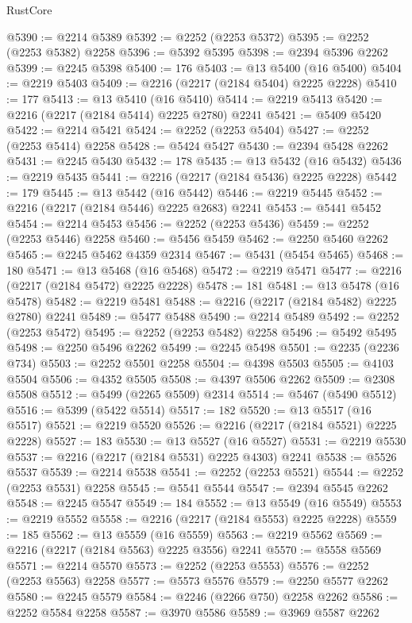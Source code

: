 \begin{lexlean}{RustCore}
\begin{coremodule}
@5390 := @2214 @5389
@5392 := @2252 (@2253 @5372)
@5395 := @2252 (@2253 @5382) @2258
@5396 := @5392 @5395
@5398 := @2394 @5396 @2262
@5399 := @2245 @5398
@5400 := 176
@5403 := @13 @5400 (@16 @5400)
@5404 := @2219 @5403
@5409 := @2216 (@2217 (@2184 @5404) @2225 @2228)
@5410 := 177
@5413 := @13 @5410 (@16 @5410)
@5414 := @2219 @5413
@5420 := @2216 (@2217 (@2184 @5414) @2225 @2780) @2241
@5421 := @5409 @5420
@5422 := @2214 @5421
@5424 := @2252 (@2253 @5404)
@5427 := @2252 (@2253 @5414) @2258
@5428 := @5424 @5427
@5430 := @2394 @5428 @2262
@5431 := @2245 @5430
@5432 := 178
@5435 := @13 @5432 (@16 @5432)
@5436 := @2219 @5435
@5441 := @2216 (@2217 (@2184 @5436) @2225 @2228)
@5442 := 179
@5445 := @13 @5442 (@16 @5442)
@5446 := @2219 @5445
@5452 := @2216 (@2217 (@2184 @5446) @2225 @2683) @2241
@5453 := @5441 @5452
@5454 := @2214 @5453
@5456 := @2252 (@2253 @5436)
@5459 := @2252 (@2253 @5446) @2258
@5460 := @5456 @5459
@5462 := @2250 @5460 @2262
@5465 := @2245 @5462 @4359 @2314
@5467 := @5431 (@5454 @5465)
@5468 := 180
@5471 := @13 @5468 (@16 @5468)
@5472 := @2219 @5471
@5477 := @2216 (@2217 (@2184 @5472) @2225 @2228)
@5478 := 181
@5481 := @13 @5478 (@16 @5478)
@5482 := @2219 @5481
@5488 := @2216 (@2217 (@2184 @5482) @2225 @2780) @2241
@5489 := @5477 @5488
@5490 := @2214 @5489
@5492 := @2252 (@2253 @5472)
@5495 := @2252 (@2253 @5482) @2258
@5496 := @5492 @5495
@5498 := @2250 @5496 @2262
@5499 := @2245 @5498
@5501 := @2235 (@2236 @734)
@5503 := @2252 @5501 @2258
@5504 := @4398 @5503
@5505 := @4103 @5504
@5506 := @4352 @5505
@5508 := @4397 @5506 @2262
@5509 := @2308 @5508
@5512 := @5499 (@2265 @5509) @2314
@5514 := @5467 (@5490 @5512)
@5516 := @5399 (@5422 @5514)
@5517 := 182
@5520 := @13 @5517 (@16 @5517)
@5521 := @2219 @5520
@5526 := @2216 (@2217 (@2184 @5521) @2225 @2228)
@5527 := 183
@5530 := @13 @5527 (@16 @5527)
@5531 := @2219 @5530
@5537 := @2216 (@2217 (@2184 @5531) @2225 @4303) @2241
@5538 := @5526 @5537
@5539 := @2214 @5538
@5541 := @2252 (@2253 @5521)
@5544 := @2252 (@2253 @5531) @2258
@5545 := @5541 @5544
@5547 := @2394 @5545 @2262
@5548 := @2245 @5547
@5549 := 184
@5552 := @13 @5549 (@16 @5549)
@5553 := @2219 @5552
@5558 := @2216 (@2217 (@2184 @5553) @2225 @2228)
@5559 := 185
@5562 := @13 @5559 (@16 @5559)
@5563 := @2219 @5562
@5569 := @2216 (@2217 (@2184 @5563) @2225 @3556) @2241
@5570 := @5558 @5569
@5571 := @2214 @5570
@5573 := @2252 (@2253 @5553)
@5576 := @2252 (@2253 @5563) @2258
@5577 := @5573 @5576
@5579 := @2250 @5577 @2262
@5580 := @2245 @5579
@5584 := @2246 (@2266 @750) @2258 @2262
@5586 := @2252 @5584 @2258
@5587 := @3970 @5586
@5589 := @3969 @5587 @2262

\end{coremodule}
\end{lexlean}
